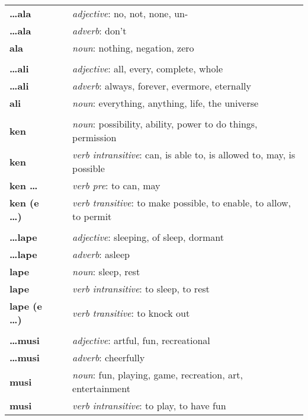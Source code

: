 \begin{supertabular}{p{2,5cm}|ll}
\textbf{\dots ala} && \textit{adjective}: no, not, none, un- \\ %
\textbf{\dots ala} && \textit{adverb}: don't \\ %
\textbf{ala} && \textit{noun}: nothing, negation, zero \\ %
 && \\ %
\textbf{\dots ali} && \textit{adjective}: all, every, complete, whole \\ %
\textbf{\dots ali} && \textit{adverb}: always, forever, evermore, eternally \\ %
\textbf{ali} && \textit{noun}: everything, anything, life, the universe \\ %
 && \\ %
\textbf{ken} && \textit{noun}: possibility, ability, power to do things, permission \\ %
\textbf{ken} && \textit{verb intransitive}: can, is able to, is allowed to, may, is possible \\ %
\textbf{ken \dots} && \textit{verb pre}: to can, may \\ %
\textbf{ken (e \dots)} && \textit{verb transitive}: to make possible, to enable, to allow, to permit \\ %
 && \\ %
\textbf{\dots lape} && \textit{adjective}: sleeping, of sleep, dormant \\ %
\textbf{\dots lape} && \textit{adverb}: asleep \\ %
\textbf{lape} && \textit{noun}: sleep, rest \\ %
\textbf{lape} && \textit{verb intransitive}: to sleep, to rest \\ %
\textbf{lape (e \dots)} && \textit{verb transitive}: to knock out \\ %
 && \\ %
\textbf{\dots musi} && \textit{adjective}: artful, fun, recreational \\ %
\textbf{\dots musi} && \textit{adverb}: cheerfully \\ %
\textbf{musi} && \textit{noun}: fun, playing, game, recreation, art, entertainment \\ %
\textbf{musi} && \textit{verb intransitive}: to play, to have fun \\ %

\end{supertabular}
